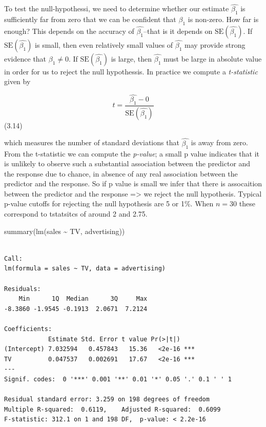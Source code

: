 \documentclass[
  letterpaper,
  DIV=11,
  numbers=noendperiod]{scrreprt}
\newenvironment{Shaded}{\begin{snugshade}}{\end{snugshade}}
\newcommand{\FunctionTok}[1]{\textcolor[rgb]{0.28,0.35,0.67}{#1}}
\newcommand{\NormalTok}[1]{\textcolor[rgb]{0.00,0.23,0.31}{#1}}
\newcommand{\SpecialCharTok}[1]{\textcolor[rgb]{0.37,0.37,0.37}{#1}}
\begin{document}
To test the null-hypothessi, we need to determine whether our estimate
\(\hat{\beta_1}\) is sufficiently far from zero that we can be confident
that \(\beta_1\) is non-zero. How far is enough? This depends on the
accuracy of \(\hat{\beta_1}\)--that is it depends on
\(\text{SE}(\hat{\beta_1})\). If \(\text{SE}(\hat{\beta_1})\) is small,
then even relatively small values of \(\hat{\beta_1}\) may provide
strong evidence that \(\beta_1 \neq 0\). If \(\text{SE}(\hat{\beta_1})\)
is large, then \(\hat{\beta_1}\) must be large in absolute value in
order for us to reject the null hypothessis. In practice we compute a
\emph{t-statistic} given by

\[
t = \frac{\hat{\beta_1} - 0}{\text{SE}(\hat{\beta_1})}
\] (3.14)

which measures the number of standard deviations that \(\hat{\beta_1}\)
is away from zero. From the t-statistic we can compute the
\emph{p-value}; a small p value indicates that it is unlikely to observe
such a substantial association between the predictor and the response
due to chance, in absence of any real association between the predictor
and the response. So if p value is small we infer that there is
assocaition between the predictor and the response =\textgreater{} we
reject the null hypothesis. Typical p-value cutoffs for rejecting the
null hypothesis are 5 or 1\%. When \(n=30\) these correspond to
tstatsitcs of around 2 and 2.75.

\begin{Shaded}
\begin{Highlighting}[]
\FunctionTok{summary}\NormalTok{(}\FunctionTok{lm}\NormalTok{(sales }\SpecialCharTok{\textasciitilde{}}\NormalTok{ TV, advertising))}
\end{Highlighting}
\end{Shaded}

\begin{verbatim}

Call:
lm(formula = sales ~ TV, data = advertising)

Residuals:
    Min      1Q  Median      3Q     Max 
-8.3860 -1.9545 -0.1913  2.0671  7.2124 

Coefficients:
            Estimate Std. Error t value Pr(>|t|)    
(Intercept) 7.032594   0.457843   15.36   <2e-16 ***
TV          0.047537   0.002691   17.67   <2e-16 ***
---
Signif. codes:  0 '***' 0.001 '**' 0.01 '*' 0.05 '.' 0.1 ' ' 1

Residual standard error: 3.259 on 198 degrees of freedom
Multiple R-squared:  0.6119,    Adjusted R-squared:  0.6099 
F-statistic: 312.1 on 1 and 198 DF,  p-value: < 2.2e-16
\end{verbatim}
\end{document}
